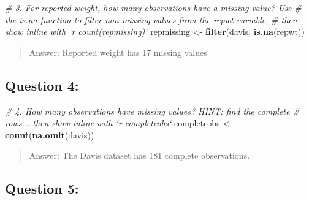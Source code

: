 \documentclass[]{elsarticle} %
\newenvironment{Shaded}{\begin{snugshade}}{\end{snugshade}}
\newcommand{\KeywordTok}[1]{\textcolor[rgb]{0.13,0.29,0.53}{\textbf{{#1}}}}
\newcommand{\StringTok}[1]{\textcolor[rgb]{0.31,0.60,0.02}{{#1}}}
\newcommand{\CommentTok}[1]{\textcolor[rgb]{0.56,0.35,0.01}{\textit{{#1}}}}
\newcommand{\NormalTok}[1]{{#1}}
\begin{document}
\begin{Shaded}
\begin{Highlighting}[]
\CommentTok{# 3. For reported weight, how many observations have a missing value? Use}
\CommentTok{# the is.na function to filter non-missing values from the repwt variable,}
\CommentTok{# then show inline with `r count(repmissing)`}
\NormalTok{repmissing <-}\StringTok{ }\KeywordTok{filter}\NormalTok{(davis, }\KeywordTok{is.na}\NormalTok{(repwt))}
\end{Highlighting}
\end{Shaded}

\begin{quote}
Answer: Reported weight has 17 missing values
\end{quote}

\subsection{Question 4:}\label{question-4}

\begin{Shaded}
\begin{Highlighting}[]
\CommentTok{# 4. How many observations have missing values? HINT: find the complete}
\CommentTok{# rows... then show inline with `r completeobs`}
\NormalTok{completeobs <-}\StringTok{ }\KeywordTok{count}\NormalTok{(}\KeywordTok{na.omit}\NormalTok{(davis))}
\end{Highlighting}
\end{Shaded}

\begin{quote}
Answer: The Davis dataset has 181 complete observations.
\end{quote}

\subsection{Question 5:}\label{question-5}

\begin{Shaded}
\end{Shaded}
\end{document}
